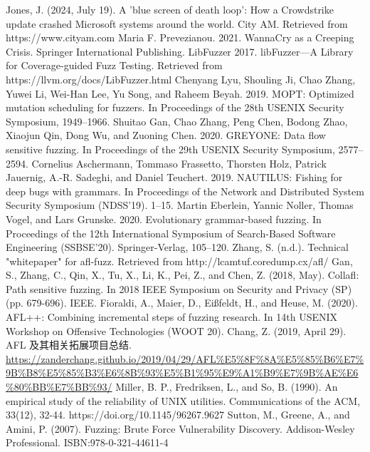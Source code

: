 \documentclass[10.5pt,compsoc]{CjC}
\theoremstyle{mystyle}
\begin{document}
\begin{thebibliography}{99}
\vspace{3mm}
  Jones, J. (2024, July 19). A 'blue screen of death loop': How a Crowdstrike update crashed Microsoft systems around the world. City AM. Retrieved from https://www.cityam.com
	 Maria F. Prevezianou. 2021. WannaCry as a Creeping Crisis. Springer International Publishing.
  LibFuzzer 2017. libFuzzer—A Library for Coverage-guided Fuzz Testing. Retrieved from https://llvm.org/docs/LibFuzzer.html
  Chenyang Lyu, Shouling Ji, Chao Zhang, Yuwei Li, Wei-Han Lee, Yu Song, and Raheem Beyah. 2019. MOPT: Optimized mutation scheduling for fuzzers. In Proceedings of the 28th USENIX Security Symposium, 1949–1966.
  Shuitao Gan, Chao Zhang, Peng Chen, Bodong Zhao, Xiaojun Qin, Dong Wu, and Zuoning Chen. 2020. GREYONE:
Data flow sensitive fuzzing. In Proceedings of the 29th USENIX Security Symposium, 2577–2594.
  Cornelius Aschermann, Tommaso Frassetto, Thorsten Holz, Patrick Jauernig, A.-R. Sadeghi, and Daniel Teuchert. 2019. NAUTILUS: Fishing for deep bugs with grammars. In Proceedings of the Network and Distributed System Security
Symposium (NDSS’19). 1–15.
  Martin Eberlein, Yannic Noller, Thomas Vogel, and Lars Grunske. 2020. Evolutionary grammar-based fuzzing. In Proceedings of the 12th International Symposium of Search-Based Software Engineering (SSBSE’20). Springer-Verlag, 105–120.
  Zhang, S. (n.d.). Technical "whitepaper" for afl-fuzz. Retrieved from http://lcamtuf.coredump.cx/afl/
  Gan, S., Zhang, C., Qin, X., Tu, X., Li, K., Pei, Z., and Chen, Z. (2018, May). Collafl: Path sensitive fuzzing. In 2018 IEEE Symposium on Security and Privacy (SP) (pp. 679-696). IEEE.
  Fioraldi, A., Maier, D., Eißfeldt, H., and Heuse, M. (2020). {AFL++}: Combining incremental steps of fuzzing research. In 14th USENIX Workshop on Offensive Technologies (WOOT 20).
  Chang, Z. (2019, April 29). AFL 及其相关拓展项目总结. 
  \url{https://zanderchang.github.io/2019/04/29/AFL%E5%8F%8A%E5%85%B6%E7%9B%B8%E5%85%B3%E6%8B%93%E5%B1%95%E9%A1%B9%E7%9B%AE%E6%80%BB%E7%BB%93/}
  Miller, B. P., Fredriksen, L., and So, B. (1990). An empirical study of the reliability of UNIX utilities. Communications of the ACM, 33(12), 32-44. https://doi.org/10.1145/96267.9627
  Sutton, M., Greene, A., and Amini, P. (2007). Fuzzing: Brute Force Vulnerability Discovery. Addison-Wesley Professional. ISBN:978-0-321-44611-4

\end{thebibliography}
\end{document}
